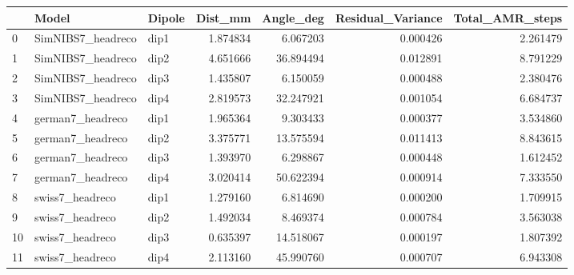 \begin{tabular}{lllrrrr}
\toprule
{} &              Model & Dipole &   Dist\_mm &  Angle\_deg &  Residual\_Variance &  Total\_AMR\_steps \\
\midrule
0  &  SimNIBS7\_headreco &   dip1 &  1.874834 &   6.067203 &           0.000426 &         2.261479 \\
1  &  SimNIBS7\_headreco &   dip2 &  4.651666 &  36.894494 &           0.012891 &         8.791229 \\
2  &  SimNIBS7\_headreco &   dip3 &  1.435807 &   6.150059 &           0.000488 &         2.380476 \\
3  &  SimNIBS7\_headreco &   dip4 &  2.819573 &  32.247921 &           0.001054 &         6.684737 \\
4  &   german7\_headreco &   dip1 &  1.965364 &   9.303433 &           0.000377 &         3.534860 \\
5  &   german7\_headreco &   dip2 &  3.375771 &  13.575594 &           0.011413 &         8.843615 \\
6  &   german7\_headreco &   dip3 &  1.393970 &   6.298867 &           0.000448 &         1.612452 \\
7  &   german7\_headreco &   dip4 &  3.020414 &  50.622394 &           0.000914 &         7.333550 \\
8  &    swiss7\_headreco &   dip1 &  1.279160 &   6.814690 &           0.000200 &         1.709915 \\
9  &    swiss7\_headreco &   dip2 &  1.492034 &   8.469374 &           0.000784 &         3.563038 \\
10 &    swiss7\_headreco &   dip3 &  0.635397 &  14.518067 &           0.000197 &         1.807392 \\
11 &    swiss7\_headreco &   dip4 &  2.113160 &  45.990760 &           0.000707 &         6.943308 \\
\bottomrule
\end{tabular}


